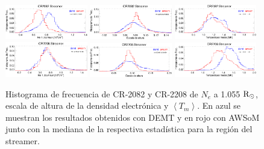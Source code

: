 \documentclass[baaa]{baaa}
\begin{document}
\begin{figure}
  \centering
  \includegraphics[width=0.32\textwidth]{figuras/proceeding_2082_demt_awsom_streamer_ne_1055.eps}
  \includegraphics[width=0.32\textwidth]{figuras/proceeding_2082_demt_awsom_streamer_lambda_n.eps}  
  \includegraphics[width=0.32\textwidth]{figuras/proceeding_2082_demt_awsom_streamer_Tm.eps}\\
  \includegraphics[width=0.32\textwidth]{figuras/proceeding_2208_demt_awsom_streamer_ne_1055.eps}
  \includegraphics[width=0.32\textwidth]{figuras/proceeding_2208_demt_awsom_streamer_lambda_n.eps}
  \includegraphics[width=0.32\textwidth]{figuras/proceeding_2208_demt_awsom_streamer_Tm.eps}
  \caption{Histograma de frecuencia de CR-2082 y CR-2208 de $N_e$ a 1.055 ${\rm R_\odot}$, escala de altura de la densidad electrónica y $\left<T_m\right>$. En azul se muestran los resultados obtenidos con DEMT y en rojo con AWSoM junto con la mediana de la respectiva estadística para la región del streamer.}
  \label{fig-histos}
\end{figure}
\end{document}
